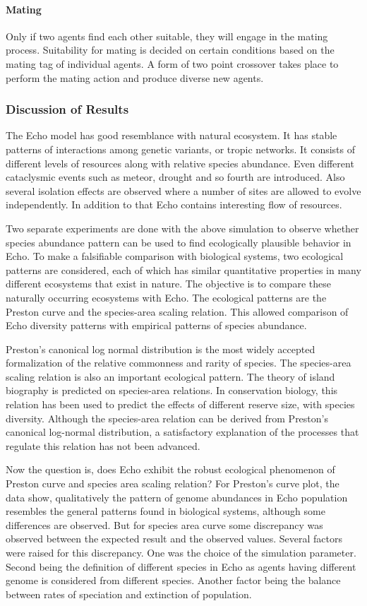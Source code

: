 \paragraph{Mating}
Only if two agents find each other suitable, they will engage in the mating process. Suitability for mating is decided on certain conditions based on the mating tag of individual agents. A form of two point crossover takes place to perform the mating action and produce diverse new agents. 

\subsubsection{Discussion of Results}
The Echo model has good resemblance with natural ecosystem. It has stable patterns of interactions among genetic variants, or tropic networks. It consists of different levels of resources along with relative species abundance. Even different cataclysmic events such as meteor, drought and so fourth are introduced. Also several isolation effects are observed where a number of sites are allowed to evolve independently. In addition to that Echo contains interesting flow of resources. 

Two separate experiments are done with the above simulation to observe whether species abundance pattern can be used to find ecologically plausible behavior in Echo. To make a falsifiable comparison with biological systems, two ecological patterns are considered, each of which has similar quantitative properties in many different ecosystems that exist in nature. The objective is to compare these naturally occurring ecosystems with Echo. The ecological patterns are the Preston  curve and the species-area scaling relation. This allowed comparison of Echo diversity patterns with empirical patterns of species abundance.

Preston's canonical log normal distribution is the most widely accepted formalization of the relative commonness and rarity of species. The species-area scaling relation is also an important ecological pattern. The theory of island biography is predicted on species-area relations. In conservation biology, this relation has been used to predict the effects of different reserve size, with species diversity. Although the species-area relation can be derived from Preston's canonical log-normal distribution, a satisfactory explanation of the processes that regulate this relation has not been advanced. 

Now the question is, does Echo exhibit the robust ecological phenomenon of Preston curve and species area scaling relation? For Preston's curve plot, the data show, qualitatively the pattern of genome abundances in Echo population resembles the general patterns found in biological systems, although some differences are observed. But for species area curve some discrepancy was observed between the expected result and the observed values. Several factors were raised for this discrepancy. One was the choice of the simulation parameter. Second being the definition of different species in Echo as agents having different genome is considered from different species. Another factor being the balance between rates of speciation and extinction of population. 

